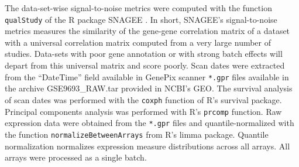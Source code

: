The data-set-wise signal-to-noise metrics were computed with the function
\texttt{qualStudy} of the \textsf{R} package \textsf{SNAGEE}
\cite{venet_measure_2012}.  In short, \textsf{SNAGEE}'s signal-to-noise metrics
measures the similarity of the gene-gene correlation matrix of a dataset with a
universal correlation matrix computed from a very large number of studies.
Data-sets with poor gene annotation or with strong batch effects will depart
from this universal matrix and score poorly.  Scan dates were extracted from the
``DateTime'' field available in GenePix scanner \texttt{*.gpr} files available
in the archive \textsf{GSE9693\_RAW.tar} provided in NCBI's GEO.  The survival
analysis of scan dates was performed with the \texttt{coxph} function of
\textsf{R}'s \textsf{survival} package.  Principal components analysis was
performed with \textsf{R}'s \texttt{prcomp} function.  Raw expression data were
obtained from the \texttt{*.gpr} files and quantile-normalized with the function
\texttt{normalizeBetweenArrays} from \textsf{R}'s \textsf{limma} package.
Quantile normalization normalizes expression measure distributions across all
arrays.  All arrays were processed as a single batch.

